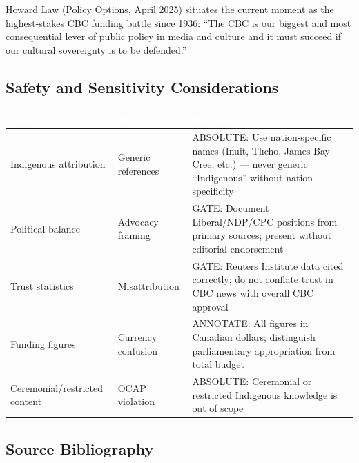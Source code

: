 \documentclass[11pt,letterpaper]{article}
\newcommand{\tableheader}[1]{\textbf{\sffamily\textcolor{white}{#1}}}
\begin{document}
Howard Law (Policy Options, April 2025) situates the current moment as the highest-stakes CBC funding battle since 1936: ``The CBC is our biggest and most consequential lever of public policy in media and culture and it must succeed if our cultural sovereignty is to be defended.''

\subsection{Safety and Sensitivity Considerations}

\begin{center}
\begin{tabularx}{\textwidth}{L{3cm}L{3cm}X}
\toprule
{}
\tableheader{Area} & \tableheader{Risk} & \tableheader{Boundary} \\
\midrule
Indigenous attribution & Generic references & ABSOLUTE: Use nation-specific names (Inuit, Tl\i{}cho, James Bay Cree, etc.) --- never generic ``Indigenous'' without nation specificity \\
Political balance & Advocacy framing & GATE: Document Liberal/NDP/CPC positions from primary sources; present without editorial endorsement \\
Trust statistics & Misattribution & GATE: Reuters Institute data cited correctly; do not conflate trust in CBC news with overall CBC approval \\
Funding figures & Currency confusion & ANNOTATE: All figures in Canadian dollars; distinguish parliamentary appropriation from total budget \\
Ceremonial/restricted content & OCAP violation & ABSOLUTE: Ceremonial or restricted Indigenous knowledge is out of scope \\
\bottomrule
\end{tabularx}
\end{center}

\subsection{Source Bibliography}
\end{document}
